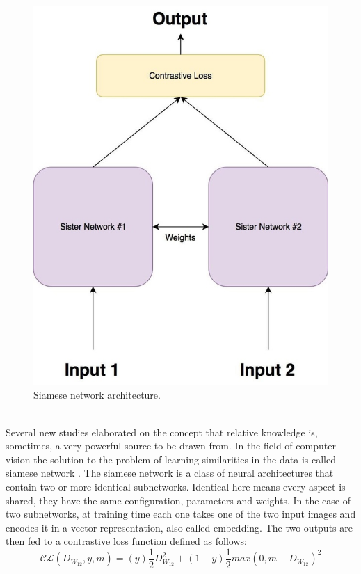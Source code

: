 \begin{figure}[b!]
    \centering
    \includegraphics[height=0.6\textheight]{./pictures/siamese}
    \caption{Siamese network architecture.}
    \label{fig:siamese}
\end{figure}\\
Several new studies elaborated on the concept that relative knowledge is, sometimes, a very powerful source to be drawn from. In the field of computer vision the solution to the problem of learning similarities in the data is called siamese network \cite{koch2015siamese}. The siamese network is a class of neural architectures that contain two or more identical subnetworks. Identical here means every aspect is shared, they have the same configuration, parameters and weights. In the case of two subnetworks, at training time each one takes one of the two input images and encodes it in a vector representation, also called embedding. The two outputs are then fed to a contrastive loss function \cite{hadsell2006dimensionality} defined as follows:
\begin{equation}
  \mathcal{CL}(D_{W_{12}}, y, m) = (y)\frac{1}{2}D_{W_{12}}^2 + (1-y)\frac{1}{2}max(0,m-D_{W_{12}})^2
\end{equation}
